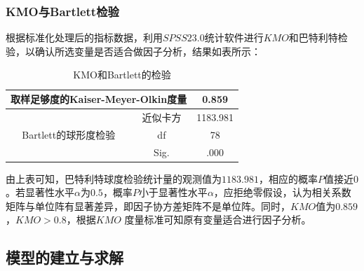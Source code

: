 \documentclass{whutmod}
\begin{document}
		\subsubsection{KMO与Bartlett检验}
		根据标准化处理后的指标数据，利用$SPSS23.0$统计软件进行$KMO$和巴特利特检验，以确认所选变量是否适合做因子分析，结果如表\label{tab1}所示：
		\begin{table}[H]
			\centering
			\caption{KMO和Bartlett的检验}\label{tab1}
			\begin{tabular}{cc|cc|cc}
				\toprule[1.5pt]
				\multicolumn{4}{c|}{取样足够度的Kaiser-Meyer-Olkin度量} & \multicolumn{2}{c}{0.859} \\
				\midrule
				\multicolumn{2}{c|}{\multirow{3}[2]{*}{Bartlett的球形度检验}} & \multicolumn{2}{c|}{近似卡方} & \multicolumn{2}{c}{1183.981} \\
				\multicolumn{2}{c|}{} & \multicolumn{2}{c|}{df} & \multicolumn{2}{c}{78} \\
				\multicolumn{2}{c|}{} & \multicolumn{2}{c|}{Sig.} & \multicolumn{2}{c}{.000} \\
				\bottomrule[2pt]
			\end{tabular}%
			\label{tab:addlabel}%
		\end{table}%
		
		由上表可知，巴特利特球度检验统计量的观测值为$1183.981$，相应的概率$P$值接近$0$。若显著性水平$α$为$0.5$，概率$P$小于显著性水平$α$，应拒绝零假设，认为相关系数矩阵与单位阵有显著差异，即因子协方差矩阵不是单位阵。同时，$KMO$值为$0.859$，$KMO>0.8$，根据$KMO$ 度量标准可知原有变量适合进行因子分析。
		
		
		

	\subsection{模型的建立与求解}
\end{document}
